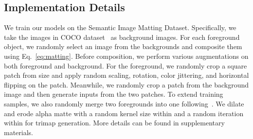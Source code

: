 \documentclass[10pt,twocolumn,letterpaper]{article}
\begin{document}
\subsection{Implementation Details}

We train our models on the Semantic Image Matting Dataset. Specifically, we take the images in COCO dataset~\cite{lin2014microsoft} as background images. For each foreground object, we randomly select an image from the backgrounds and composite them using Eq.~\ref{eq:matting}. Before composition, we perform various augmentations on both foreground and background. For the foreground, we randomly crop a square patch from size  and apply random scaling, rotation, color jittering, and horizontal flipping on the patch. Meanwhile, we randomly crop a patch from the background image and then generate inputs from the two patches. To extend training samples, we also randomly merge two foregrounds into one following~\cite{li2020natural}. 
We dilate and erode alpha matte with a random kernel size within  and a random iteration within  for trimap generation. More details can be found in  supplementary materials. 
\end{document}
